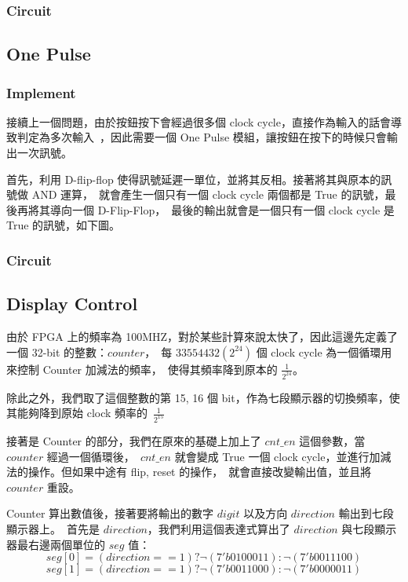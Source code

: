 \documentclass[10.5pt,compsoc,UTF8]{CjC}
\theoremstyle{mystyle}
\begin{document}
\subsubsection*{Circuit}

\subsection{One Pulse}
\subsubsection*{Implement}
接續上一個問題，由於按鈕按下會經過很多個 clock cycle，直接作為輸入的話會導致判定為多次輸入\
，因此需要一個 One Pulse 模組，讓按鈕在按下的時候只會輸出一次訊號。
\par
首先，利用 D-flip-flop 使得訊號延遲一單位，並將其反相。接著將其與原本的訊號做 AND 運算，\
就會產生一個只有一個 clock cycle 兩個都是 True 的訊號，最後再將其導向一個 D-Flip-Flop，\
最後的輸出就會是一個只有一個 clock cycle 是 True 的訊號，如下圖。


\subsubsection*{Circuit}

\subsection{Display Control}
由於 FPGA 上的頻率為 100MHZ，對於某些計算來說太快了，因此這邊先定義了一個 32-bit 的整數：$counter$，\
每 $33554432 (2^{24})$ 個 clock cycle 為一個循環用來控制 Counter 加減法的頻率，\
使得其頻率降到原本的 $\frac{1}{2^{24}}$。
\par
除此之外，我們取了這個整數的第 15, 16 個 bit，作為七段顯示器的切換頻率，使其能夠降到原始 clock 頻率的\
$\frac{1}{2^{15}}$
\par
接著是 Counter 的部分，我們在原來的基礎上加上了 $cnt\_en$ 這個參數，當 $counter$ 經過一個循環後，\
$cnt\_en$ 就會變成 True 一個 clock cycle，並進行加減法的操作。但如果中途有 flip, reset 的操作，\
就會直接改變輸出值，並且將 $counter$ 重設。
\par
Counter 算出數值後，接著要將輸出的數字 $digit$ 以及方向 $direction$ 輸出到七段顯示器上。\
首先是 $direction$，我們利用這個表達式算出了 $direction$ 與七段顯示器最右邊兩個單位的 $seg$ 值：
$$seg[0] = (direction == 1) ? \lnot(7'b0100011) : \lnot(7'b0011100)$$
$$seg[1] = (direction == 1) ? \lnot(7'b0011000) : \lnot(7'b0000011)$$
\end{document}
